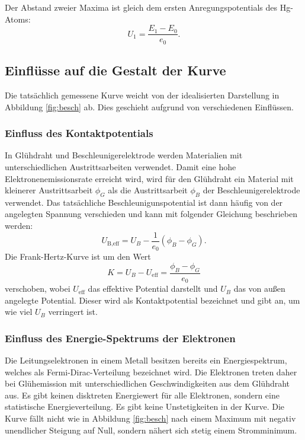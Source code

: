 \noindent Der Abstand zweier Maxima ist gleich dem ersten Anregungspotentials des Hg-Atoms:
\begin{equation}
  \label{eq:pot}
  U_1 = \frac{E_1 - E_0}{e_0}  .
\end{equation}
 \subsection{Einflüsse auf die Gestalt der Kurve}
Die tatsächlich gemessene Kurve weicht von der idealisierten Darstellung in Abbildung \ref{fig:besch} ab.
Dies geschieht aufgrund von verschiedenen Einflüssen.
\subsubsection{Einfluss des Kontaktpotentials}
In Glühdraht und Beschleunigerelektrode werden Materialien mit unterschiedlichen Austrittsarbeiten verwendet.
Damit eine hohe Elektronenemissionsrate erreicht wird, wird für den Glühdraht ein Material mit kleinerer Austrittsarbeit $\phi_G$ als die Austrittsarbeit $\phi_B$ der Beschleunigerelektrode verwendet.
Das tatsächliche Beschleunigunspotential ist dann häufig von der angelegten Spannung verschieden und kann mit folgender Gleichung beschrieben werden:
\begin{equation}
  U_\text{B,eff}= U_B-\frac{1}{e_0}(\phi_B -\phi_G) .
\end{equation}
Die Frank-Hertz-Kurve ist um den Wert
\begin{equation}
  \label{eq:k}
  K = U_B - U_\text{eff} = \frac{\phi_B - \phi_G}{e_0}
\end{equation}
verschoben, wobei $U_\text{eff}$ das effektive Potential darstellt und $U_B$ das von außen angelegte Potential.
Dieser wird als Kontaktpotential bezeichnet und gibt an, um wie viel $U_B$ verringert ist.
\subsubsection{Einfluss des Energie-Spektrums der Elektronen}
Die Leitungselektronen in einem Metall besitzen bereits ein Energiespektrum, welches als Fermi-Dirac-Verteilung bezeichnet wird.
Die Elektronen treten daher bei Glühemission mit unterschiedlichen Geschwindigkeiten aus dem Glühdraht aus.
Es gibt keinen disktreten Energiewert für alle Elektronen, sondern eine statistische Energieverteilung.
Es gibt keine Unstetigkeiten in der Kurve.
Die Kurve fällt nicht wie in Abbildung \ref{fig:besch} nach einem Maximum mit negativ unendlicher Steigung auf Null, sondern nähert sich stetig einem Stromminimum.
